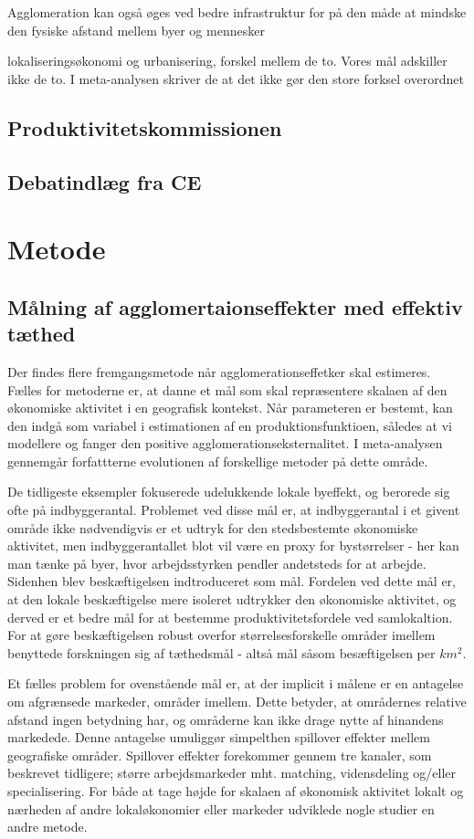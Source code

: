 \documentclass[a4paper, 12pt, titlepage]{article}
\begin{document}
Agglomeration kan også øges ved bedre infrastruktur for på den måde at mindske den fysiske afstand mellem byer og mennesker

lokaliseringsøkonomi og urbanisering, forskel mellem de to. Vores mål adskiller ikke de to. I meta-analysen skriver de at det ikke gør den store forksel overordnet


\subsection{Produktivitetskommissionen}
\subsection{Debatindlæg fra CE}
\section{Metode}
\subsection{Målning af agglomertaionseffekter med effektiv tæthed }

Der findes flere fremgangsmetode når agglomerationseffetker skal estimeres. Fælles for metoderne er, at danne et mål som skal repræsentere skalaen af den økonomiske aktivitet i en geografisk kontekst. Når parameteren er bestemt, kan den indgå som variabel i estimationen af en produktionsfunktioen, således at vi modellere og fanger den positive agglomerationseksternalitet. I meta-analysen \cite{melo2009meta} gennemgår forfattterne evolutionen af forskellige metoder på dette område. 

De tidligeste eksempler fokuserede udelukkende lokale byeffekt, og berorede sig ofte på indbyggerantal. Problemet ved disse mål er, at indbyggerantal i et givent område ikke nødvendigvis er et udtryk for den stedsbestemte økonomiske aktivitet, men indbyggerantallet blot vil være en proxy for bystørrelser - her kan man tænke på byer, hvor arbejdsstyrken pendler andetsteds for at arbejde. Sidenhen blev beskæftigelsen indtroduceret som mål. Fordelen ved dette mål er, at den lokale beskæftigelse mere isoleret udtrykker den økonomiske aktivitet, og derved er et bedre mål for at bestemme produktivitetsfordele ved samlokaltion. For at gøre beskæftigelsen robust overfor størrelsesforskelle områder imellem benyttede forskningen sig af tæthedsmål - altså mål såsom besæftigelsen per $km^2$. 

Et fælles problem for ovenstående mål er, at der implicit i målene er en antagelse om afgrænsede markeder, områder imellem. Dette betyder, at områdernes relative afstand ingen betydning har, og områderne kan ikke drage nytte af hinandens markedede. Denne antagelse umuliggør simpelthen spillover effekter mellem geografiske områder. Spillover effekter forekommer gennem tre kanaler, som beskrevet tidligere; større arbejdsmarkeder mht. matching, vidensdeling og/eller specialisering. For både at tage højde for skalaen af økonomisk aktivitet lokalt og nærheden af andre lokaløkonomier eller markeder udviklede nogle studier en andre metode.  
\end{document}
